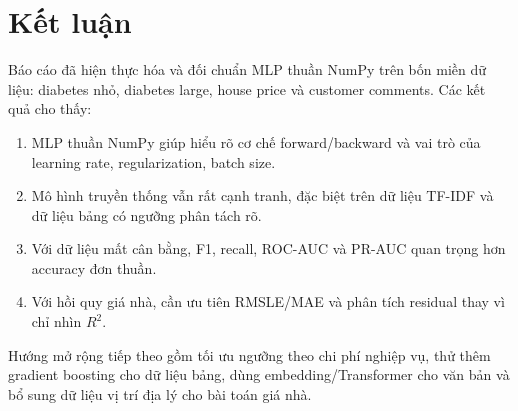 \documentclass[12pt,a4paper]{report}
\begin{document}
\section{Kết luận}
Báo cáo đã hiện thực hóa và đối chuẩn MLP thuần NumPy trên bốn miền dữ liệu: diabetes nhỏ, diabetes large, house price và customer comments. Các kết quả cho thấy:
\begin{enumerate}
    \item MLP thuần NumPy giúp hiểu rõ cơ chế forward/backward và vai trò của learning rate, regularization, batch size.
    \item Mô hình truyền thống vẫn rất cạnh tranh, đặc biệt trên dữ liệu TF-IDF và dữ liệu bảng có ngưỡng phân tách rõ.
    \item Với dữ liệu mất cân bằng, F1, recall, ROC-AUC và PR-AUC quan trọng hơn accuracy đơn thuần.
    \item Với hồi quy giá nhà, cần ưu tiên RMSLE/MAE và phân tích residual thay vì chỉ nhìn $R^2$.
\end{enumerate}

Hướng mở rộng tiếp theo gồm tối ưu ngưỡng theo chi phí nghiệp vụ, thử thêm gradient boosting cho dữ liệu bảng, dùng embedding/Transformer cho văn bản và bổ sung dữ liệu vị trí địa lý cho bài toán giá nhà.
\end{document}

